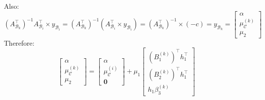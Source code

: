 \documentclass[letterpaper, 11pt]{article}
\theoremstyle{plain}
\theoremstyle{definition}
\begin{document}
Also:
\begin{equation}
  (A_{\mathcal{B}_k}^\intercal)^{-1}A_{\mathcal{B}_i}^\intercal \times y_{\mathcal{B}_i} = (A_{\mathcal{B}_k}^\intercal)^{-1}(A_{\mathcal{B}_i}^\intercal \times y_{\mathcal{B}_i})
  =(A_{\mathcal{B}_k}^\intercal)^{-1}\times (-c) = y_{\mathcal{B}_k} = 
  \begin{bmatrix}
    \alpha \\
    \mu_{\mathcal{C}}^{(k)}  \\
    \mu_2
  \end{bmatrix}
\end{equation}
Therefore:
\begin{equation}
  \begin{bmatrix}
    \alpha \\
    \mu_{\mathcal{C}}^{(k)}  \\
    \mu_2
  \end{bmatrix} = 
  \begin{bmatrix}
    \alpha \\
    \mu_{\mathcal{C}}^{(i)} \\
    \mathbf{0}
  \end{bmatrix} + \mu_1
  \begin{bmatrix}
    (B_1^{(k)})^\intercal h_1^\intercal  \\
    (B_2^{(k)})^\intercal h_1^\intercal  \\
    h_1 \beta_3^{(k)}
  \end{bmatrix}
\end{equation}
\end{document}

